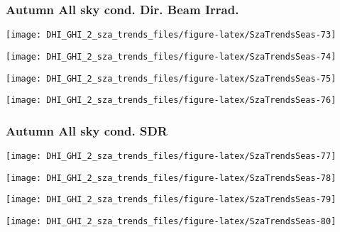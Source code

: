 \documentclass[
  10pt,
  a4paper,oneside]{article}
\begin{document}
\newpage

\hypertarget{autumn-all-sky-cond.-dir.-beam-irrad.}{%
\subsubsection{Autumn All sky cond. Dir. Beam Irrad.}\label{autumn-all-sky-cond.-dir.-beam-irrad.}}

\begin{center}\texttt{[image: DHI\_GHI\_2\_sza\_trends\_files/figure-latex/SzaTrendsSeas-73]} \end{center}

\begin{center}\texttt{[image: DHI\_GHI\_2\_sza\_trends\_files/figure-latex/SzaTrendsSeas-74]} \end{center}

\begin{center}\texttt{[image: DHI\_GHI\_2\_sza\_trends\_files/figure-latex/SzaTrendsSeas-75]} \end{center}

\begin{center}\texttt{[image: DHI\_GHI\_2\_sza\_trends\_files/figure-latex/SzaTrendsSeas-76]} \end{center}

\newpage

\hypertarget{autumn-all-sky-cond.-sdr}{%
\subsubsection{Autumn All sky cond. SDR}\label{autumn-all-sky-cond.-sdr}}

\begin{center}\texttt{[image: DHI\_GHI\_2\_sza\_trends\_files/figure-latex/SzaTrendsSeas-77]} \end{center}

\begin{center}\texttt{[image: DHI\_GHI\_2\_sza\_trends\_files/figure-latex/SzaTrendsSeas-78]} \end{center}

\begin{center}\texttt{[image: DHI\_GHI\_2\_sza\_trends\_files/figure-latex/SzaTrendsSeas-79]} \end{center}

\begin{center}\texttt{[image: DHI\_GHI\_2\_sza\_trends\_files/figure-latex/SzaTrendsSeas-80]} \end{center}
\end{document}
